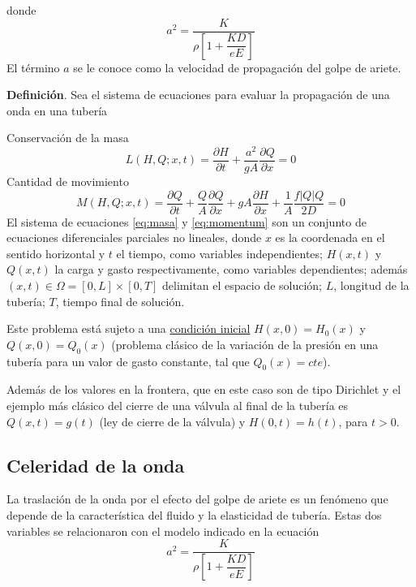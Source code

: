 \documentclass[letterpaper]{report}
\begin{document}
donde
\begin{equation}
	a^2=\dfrac{K}{\rho\left[1+\dfrac{KD}{eE}\right]}
\end{equation}
El término $a$ se le conoce como la velocidad de propagación del golpe de ariete.\bigskip

\textbf{Definición}. Sea el sistema de ecuaciones para evaluar la propagación de una onda en una tubería\bigskip

Conservación de la masa\\
\begin{equation}
	L\left(H,Q;x,t\right)=\frac{\partial H}{\partial t}+\frac{a^2}{gA}\frac{\partial Q}{\partial x}=0
\label{eq:masa}
\end{equation}
Cantidad de movimiento
\begin{equation}
	M\left(H,Q;x,t\right)=\frac{\partial Q}{\partial t}+\frac{Q}{A}\frac{\partial Q}{\partial x}+gA\frac{\partial H}{\partial x}+\frac{1}{A}\frac{f\left|Q\right|Q}{2D}= 0
\label{eq:momentum}
\end{equation}
El sistema de ecuaciones \ref{eq:masa} y \ref{eq:momentum} son un conjunto de ecuaciones diferenciales parciales no lineales, donde $x$  es la coordenada en el sentido horizontal y $t$ el tiempo, como variables independientes; $H(x,t)$ y $Q(x,t)$ la carga y gasto respectivamente, como variables dependientes; además $(x,t) \in \Omega =[0,L] \times [0,T]$ delimitan el espacio de solución; $L$, longitud de la tubería; $T$, tiempo final de solución.\bigskip

Este problema está sujeto a una \underline{condición inicial} $H(x,0)=H_0(x)$ y $Q(x,0)=Q_0(x)$ (problema clásico de la variación de la presión en una tubería para un valor de gasto constante, tal que $Q_0(x)=cte$).\bigskip

Además de los valores en la frontera, que en este caso son de tipo Dirichlet y el ejemplo más clásico del cierre de una válvula al final de la tubería es $Q(x,t)=g(t)$ (ley de cierre de la válvula) y $H(0,t)=h(t)$, para $t>0$.

\subsection{Celeridad de la onda}
La traslación de la onda por el efecto del golpe de ariete es un fenómeno que depende de la característica del fluido y la elasticidad de tubería. Estas dos variables se relacionaron con el modelo indicado en la ecuación 
\begin{equation}
	a^2=\dfrac{K}{\rho\left[1+\dfrac{KD}{eE}\right]}
\label{eq:acuad}
\end{equation}
\end{document}
